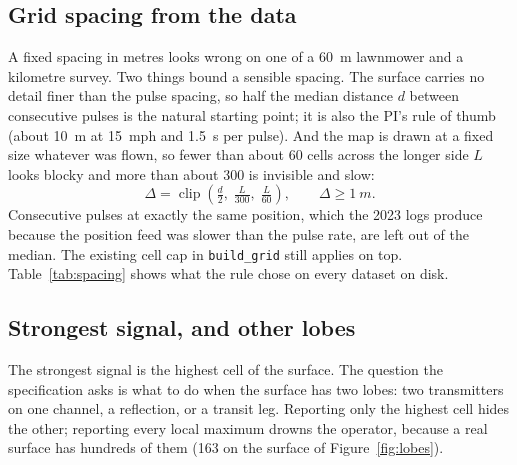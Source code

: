 \documentclass[11pt,a4paper]{article}
\newcommand{\code}[1]{\texttt{\small #1}}
\begin{document}
\subsection{Grid spacing from the data}
\label{sec:spacing}

A fixed spacing in metres looks wrong on one of a \SI{60}{m} lawnmower and a kilometre
survey. Two things bound a sensible spacing. The surface carries no detail finer than the
pulse spacing, so half the median distance $d$ between consecutive pulses is the natural
starting point; it is also the PI's rule of thumb (about \SI{10}{m} at \SI{15}{mph} and
\SI{1.5}{s} per pulse). And the map is drawn at a fixed size whatever was flown, so fewer than
about 60 cells across the longer side $L$ looks blocky and more than about 300 is invisible
and slow:
\begin{equation}
\Delta = \operatorname{clip}\!\left(\tfrac{d}{2},\; \tfrac{L}{300},\; \tfrac{L}{60}\right),
\qquad \Delta \ge \SI{1}{m}.
\label{eq:spacing}
\end{equation}
Consecutive pulses at exactly the same position, which the 2023 logs produce because the
position feed was slower than the pulse rate, are left out of the median. The existing cell
cap in \code{build\_grid} still applies on top. Table~\ref{tab:spacing} shows what the rule
chose on every dataset on disk.

\begin{table}[htbp]
\centering
\resizebox{\textwidth}{!}{}
\caption{Grid spacing chosen by equation~\eqref{eq:spacing} across the datasets on disk, the
bound that decided it, and the time for the whole review on the development laptop. Every
survey landed on half the pulse spacing; only the two smallest flights and the 2023 log with
duplicated positions fell back to an extent bound.}
\label{tab:spacing}
\end{table}

\subsection{Strongest signal, and other lobes}
\label{sec:lobes}

The strongest signal is the highest cell of the surface. The question the specification asks
is what to do when the surface has two lobes: two transmitters on one channel, a reflection,
or a transit leg. Reporting only the highest cell hides the other; reporting every local
maximum drowns the operator, because a real surface has hundreds of them (163 on the surface
of Figure~\ref{fig:lobes}).
\end{document}
